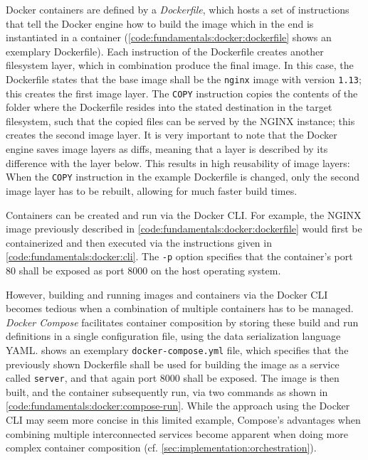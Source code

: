 Docker containers are defined by a \emph{Dockerfile}, which hosts a set of instructions that tell the Docker engine how to build the image which in the end is instantiated in a container (\cref{code:fundamentals:docker:dockerfile} shows an exemplary Dockerfile).
Each instruction of the Dockerfile creates another filesystem layer, which in combination produce the final image.
In this case, the Dockerfile states that the base image shall be the \texttt{nginx} image with version \texttt{1.13}; this creates the first image layer.
The \texttt{COPY} instruction copies the contents of the folder where the Dockerfile resides into the stated destination in the target filesystem, such that the copied files can be served by the NGINX instance; this creates the second image layer.
It is very important to note that the Docker engine saves image layers as diffs, meaning that a layer is described by its  difference with the layer below.
This results in high reusability of image layers: When the \texttt{COPY} instruction in the example Dockerfile is changed, only the second image layer has to be rebuilt, allowing for much faster build times.



Containers can be created and run via the Docker \ac{CLI}.
For example, the NGINX image previously described in \cref{code:fundamentals:docker:dockerfile} would first be containerized and then executed via the instructions given in \cref{code:fundamentals:docker:cli}.
The \texttt{-p} option specifies that the container's port 80 shall be exposed as port 8000 on the host operating system.



However, building and running images and containers via the Docker \ac{CLI} becomes tedious when a combination of multiple containers has to be managed.
\emph{Docker Compose} facilitates container composition by storing these build and run definitions in a single configuration file, using the data serialization language \ac{YAML}.
 shows an exemplary \texttt{docker-compose.yml} file, which specifies that  the previously shown Dockerfile shall be used for building the image as a service called \texttt{server}, and that again port 8000 shall be exposed.
The image is then built, and the container subsequently run, via two commands as shown in \cref{code:fundamentals:docker:compose-run}.
While the approach using the Docker CLI may seem more concise in this limited example, Compose's advantages when combining multiple interconnected services become apparent when doing more complex container composition (cf. \cref{sec:implementation:orchestration}).


